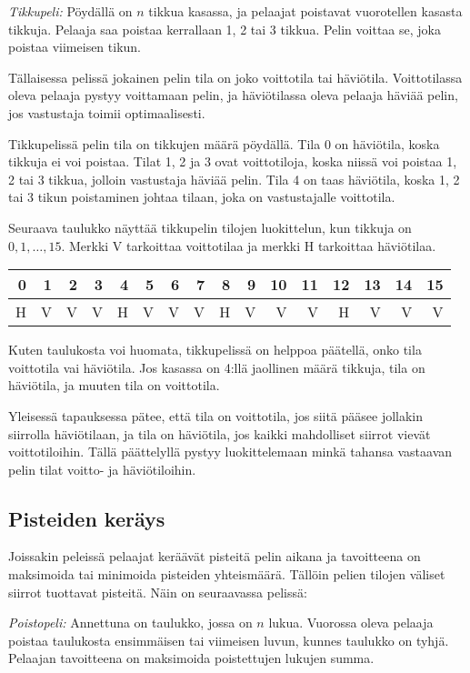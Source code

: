 \textit{Tikkupeli:} Pöydällä on $n$ tikkua kasassa,
ja pelaajat poistavat vuorotellen kasasta tikkuja.
Pelaaja saa poistaa kerrallaan 1, 2 tai 3 tikkua.
Pelin voittaa se, joka poistaa viimeisen tikun.

Tällaisessa pelissä jokainen pelin tila on joko
voittotila tai häviötila.
Voittotilassa oleva pelaaja pystyy
voittamaan pelin,
ja häviötilassa oleva pelaaja häviää pelin,
jos vastustaja toimii optimaalisesti.

Tikkupelissä pelin tila on tikkujen määrä pöydällä.
Tila 0 on häviötila, koska tikkuja ei voi poistaa.
Tilat 1, 2 ja 3 ovat voittotiloja,
koska niissä voi poistaa 1, 2 tai 3 tikkua,
jolloin vastustaja häviää pelin.
Tila 4 on taas häviötila, koska 1, 2 tai 3 tikun
poistaminen johtaa tilaan,
joka on vastustajalle voittotila.

Seuraava taulukko näyttää tikkupelin tilojen luokittelun,
kun tikkuja on $0,1,\ldots,15$.
Merkki V tarkoittaa voittotilaa ja merkki H tarkoittaa häviötilaa.

\begin{center}
\begin{tabular}{rrrrrrrrrrrrrrrr}
0 & 1 & 2 & 3 & 4 & 5 & 6 & 7 & 8 & 9 & 10 & 11 & 12 & 13 & 14 & 15\\
\hline
H & V & V & V & H & V & V & V & H & V & V & V & H & V & V & V \\
\end{tabular}
\end{center}

Kuten taulukosta voi huomata,
tikkupelissä on helppoa päätellä,
onko tila voittotila vai häviötila.
Jos kasassa on 4:llä jaollinen määrä tikkuja,
tila on häviötila,
ja muuten tila on voittotila.

Yleisessä tapauksessa pätee, että tila on
voittotila, jos siitä pääsee jollakin siirrolla häviötilaan,
ja tila on häviötila,
jos kaikki mahdolliset siirrot vievät voittotiloihin.
Tällä päättelyllä pystyy luokittelemaan minkä tahansa vastaavan
pelin tilat voitto- ja häviötiloihin.

\subsection{Pisteiden keräys}

Joissakin peleissä pelaajat keräävät pisteitä
pelin aikana ja tavoitteena on maksimoida
tai minimoida pisteiden yhteismäärä.
Tällöin pelien tilojen väliset siirrot
tuottavat pisteitä.
Näin on seuraavassa pelissä:

\textit{Poistopeli:} Annettuna on taulukko,
jossa on $n$ lukua.
Vuorossa oleva pelaaja poistaa
taulukosta ensimmäisen tai viimeisen
luvun, kunnes taulukko on tyhjä.
Pelaajan tavoitteena on
maksimoida poistettujen lukujen summa.

